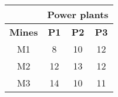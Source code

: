 \begin{center}
\renewcommand{\arraystretch}{1.25}
\setlength{\tabcolsep}{8pt}
\begin{tabular}{ |c|c|c|c| }
  \hline
   & \multicolumn{3}{c|}{\textbf{Power plants}} \\ \hline
  \textbf{Mines} & \textbf{P1} & \textbf{P2} & \textbf{P3} \\ \hline
  M1 & 8  & 10 & 12 \\ \hline
  M2 & 12 & 13 & 12 \\ \hline
  M3 & 14 & 10 & 11 \\ \hline
\end{tabular}
\end{center}

